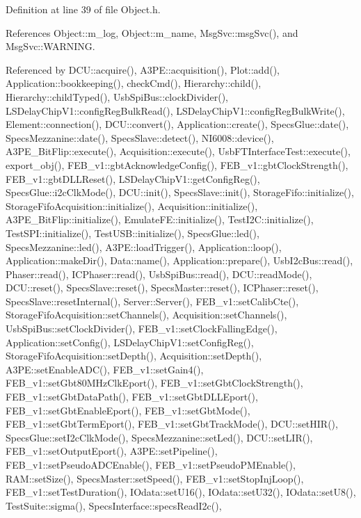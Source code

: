 Definition at line 39 of file Object.\+h.



References Object\+::m\+\_\+log, Object\+::m\+\_\+name, Msg\+Svc\+::msg\+Svc(), and Msg\+Svc\+::\+W\+A\+R\+N\+I\+NG.



Referenced by D\+C\+U\+::acquire(), A3\+P\+E\+::acquisition(), Plot\+::add(), Application\+::bookkeeping(), check\+Cmd(), Hierarchy\+::child(), Hierarchy\+::child\+Typed(), Usb\+Spi\+Bus\+::clock\+Divider(), L\+S\+Delay\+Chip\+V1\+::config\+Reg\+Bulk\+Read(), L\+S\+Delay\+Chip\+V1\+::config\+Reg\+Bulk\+Write(), Element\+::connection(), D\+C\+U\+::convert(), Application\+::create(), Specs\+Glue\+::date(), Specs\+Mezzanine\+::date(), Specs\+Slave\+::detect(), N\+I6008\+::device(), A3\+P\+E\+\_\+\+Bit\+Flip\+::execute(), Acquisition\+::execute(), Usb\+F\+T\+Interface\+Test\+::execute(), export\+\_\+obj(), F\+E\+B\+\_\+v1\+::gbt\+Acknowledge\+Config(), F\+E\+B\+\_\+v1\+::gbt\+Clock\+Strength(), F\+E\+B\+\_\+v1\+::gbt\+D\+L\+L\+Reset(), L\+S\+Delay\+Chip\+V1\+::get\+Config\+Reg(), Specs\+Glue\+::i2c\+Clk\+Mode(), D\+C\+U\+::init(), Specs\+Slave\+::init(), Storage\+Fifo\+::initialize(), Storage\+Fifo\+Acquisition\+::initialize(), Acquisition\+::initialize(), A3\+P\+E\+\_\+\+Bit\+Flip\+::initialize(), Emulate\+F\+E\+::initialize(), Test\+I2\+C\+::initialize(), Test\+S\+P\+I\+::initialize(), Test\+U\+S\+B\+::initialize(), Specs\+Glue\+::led(), Specs\+Mezzanine\+::led(), A3\+P\+E\+::load\+Trigger(), Application\+::loop(), Application\+::make\+Dir(), Data\+::name(), Application\+::prepare(), Usb\+I2c\+Bus\+::read(), Phaser\+::read(), I\+C\+Phaser\+::read(), Usb\+Spi\+Bus\+::read(), D\+C\+U\+::read\+Mode(), D\+C\+U\+::reset(), Specs\+Slave\+::reset(), Specs\+Master\+::reset(), I\+C\+Phaser\+::reset(), Specs\+Slave\+::reset\+Internal(), Server\+::\+Server(), F\+E\+B\+\_\+v1\+::set\+Calib\+Cte(), Storage\+Fifo\+Acquisition\+::set\+Channels(), Acquisition\+::set\+Channels(), Usb\+Spi\+Bus\+::set\+Clock\+Divider(), F\+E\+B\+\_\+v1\+::set\+Clock\+Falling\+Edge(), Application\+::set\+Config(), L\+S\+Delay\+Chip\+V1\+::set\+Config\+Reg(), Storage\+Fifo\+Acquisition\+::set\+Depth(), Acquisition\+::set\+Depth(), A3\+P\+E\+::set\+Enable\+A\+D\+C(), F\+E\+B\+\_\+v1\+::set\+Gain4(), F\+E\+B\+\_\+v1\+::set\+Gbt80\+M\+Hz\+Clk\+Eport(), F\+E\+B\+\_\+v1\+::set\+Gbt\+Clock\+Strength(), F\+E\+B\+\_\+v1\+::set\+Gbt\+Data\+Path(), F\+E\+B\+\_\+v1\+::set\+Gbt\+D\+L\+L\+Eport(), F\+E\+B\+\_\+v1\+::set\+Gbt\+Enable\+Eport(), F\+E\+B\+\_\+v1\+::set\+Gbt\+Mode(), F\+E\+B\+\_\+v1\+::set\+Gbt\+Term\+Eport(), F\+E\+B\+\_\+v1\+::set\+Gbt\+Track\+Mode(), D\+C\+U\+::set\+H\+I\+R(), Specs\+Glue\+::set\+I2c\+Clk\+Mode(), Specs\+Mezzanine\+::set\+Led(), D\+C\+U\+::set\+L\+I\+R(), F\+E\+B\+\_\+v1\+::set\+Output\+Eport(), A3\+P\+E\+::set\+Pipeline(), F\+E\+B\+\_\+v1\+::set\+Pseudo\+A\+D\+C\+Enable(), F\+E\+B\+\_\+v1\+::set\+Pseudo\+P\+M\+Enable(), R\+A\+M\+::set\+Size(), Specs\+Master\+::set\+Speed(), F\+E\+B\+\_\+v1\+::set\+Stop\+Inj\+Loop(), F\+E\+B\+\_\+v1\+::set\+Test\+Duration(), I\+Odata\+::set\+U16(), I\+Odata\+::set\+U32(), I\+Odata\+::set\+U8(), Test\+Suite\+::sigma(), Specs\+Interface\+::specs\+Read\+I2c(), 